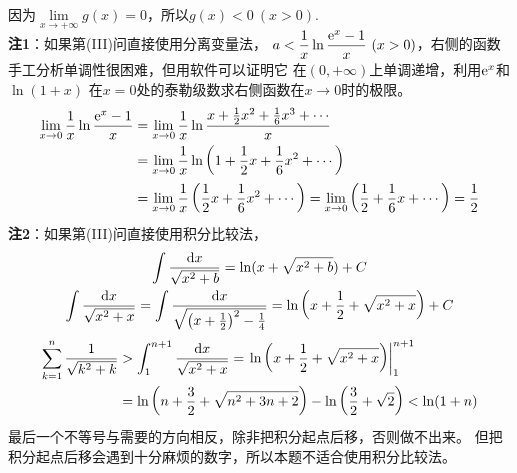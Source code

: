 \begin{enumerate}[label={【\textbf{例\thechapter.\arabic*}】},
 leftmargin=\inteval{\myenumleftmargin}pt,
 itemsep=\inteval{\myenumitempsep}pt,
 itemindent=\inteval{\myenumitemindent}pt]
因为$ \lim\limits_{x\to+\infty}g(x)=0 $，所以$ g(x)<0\ (x>0) $. \\
\textbf{注1}：如果第(III)问直接使用分离变量法，
$ a<\dfrac{1}{x}\ln\dfrac{\e^x-1}{x}\ (x>0) $，右侧的函数
手工分析单调性很困难，但用软件可以证明它
在$ (0,+\infty) $上单调递增，利用$ \mathrm{e}^x $和$ \ln(1+x) $
在$ x=0 $处的泰勒级数求右侧函数在$ x\to 0 $时的极限。
\begin{align*}
    \lim_{x\to 0} \dfrac{1}{x}\ln\dfrac{\mathrm{e}^x-1}{x}  &=
    \lim_{x\to 0} \dfrac{1}{x}\ln\dfrac{x+
        \frac{1}{2}x^2+\frac{1}{6}x^3+\cdots}{x}\\ &=
    \lim_{x\to 0} \dfrac{1}{x}\ln\left(1+
    \frac{1}{2}x+\frac{1}{6}x^2+\cdots\right)\\ &=\lim_{x\to 0} 
    \dfrac{1}{x}\left(\frac{1}{2}x+\frac{1}{6}x^2+\cdots\right) 
    =\lim_{x\to 0}\left(\frac{1}{2}+\frac{1}{6}x+\cdots\right)
    =\dfrac{1}{2}
\end{align*}
\textbf{注2}：如果第(III)问直接使用积分比较法，
\begin{gather*}
    \int \dfrac{\mathrm{d} x}{\sqrt{x^2+b}}=\ln(x+\sqrt{x^2+b})+C \\
    \int \dfrac{\mathrm{d} x}{\sqrt{x^2+x}}=
    \int \dfrac{\mathrm{d} x}{\sqrt{\left(x+\frac{1}{2}\right)^2-\frac{1}{4}}}=
    \ln\left(x+\dfrac{1}{2}+\sqrt{x^2+x}\right)+C   
\end{gather*}
\begin{align*}
    \sum_{k=1}^{n}\dfrac{1}{\sqrt{k^2+k}} &>
    \int_1^{n+1}\dfrac{\mathrm{d} x}{\sqrt{x^2+x}} =
    \left.\ln\left(x+\dfrac{1}{2}+\sqrt{x^2+x}\right)\right|_1^{n+1} \\
    & =\ln\left(n+\dfrac{3}{2}+\sqrt{n^2+3n+2}\right)-
    \ln\left(\dfrac{3}{2}+\sqrt{2}\right)<\ln(1+n)
\end{align*}
最后一个不等号与需要的方向相反，除非把积分起点后移，否则做不出来。
但把积分起点后移会遇到十分麻烦的数字，所以本题不适合使用积分比较法。


\end{enumerate}
